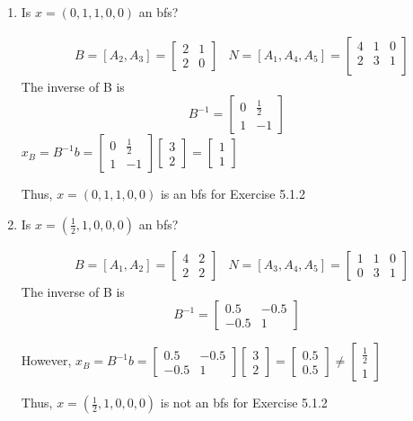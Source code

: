 \documentclass[11pt]{article}
\begin{document}
\begin{enumerate}
    \item Is $x=(0, 1, 1, 0, 0)$ an bfs? \par
    \begin{align*}
        & B = [A_2, A_3] = \begin{bmatrix}2 & 1 \\ 2 & 0\end{bmatrix} & N = [A_1, A_4, A_5] = \begin{bmatrix} 4 & 1 & 0 \\ 2 & 3 & 1 \\ \end{bmatrix}
    \end{align*}
    The inverse of B is $$B^{-1} = \begin{bmatrix} 0 &  \frac{1}{2} \\ 1 & -1 \end{bmatrix}$$
    $x_B = B^{-1}b = \begin{bmatrix} 0 &  \frac{1}{2} \\ 1 & -1 \end{bmatrix} \begin{bmatrix} 3 \\  2\end{bmatrix} = \begin{bmatrix} 1 \\ 1\end{bmatrix} $
    
    Thus, $x=(0, 1, 1, 0, 0)$ is an bfs for Exercise 5.1.2
    
    \item Is $x=(\frac{1}{2}, 1, 0, 0, 0)$ an bfs? \par
    \begin{align*}
        & B = [A_1, A_2] = \begin{bmatrix}4 & 2 \\ 2 & 2\end{bmatrix} & N = [A_3, A_4, A_5] = \begin{bmatrix} 1 & 1 & 0 \\ 0 & 3 & 1 \end{bmatrix}
    \end{align*}
    The inverse of B is $$B^{-1} = \begin{bmatrix} 0.5 & -0.5 \\ -0.5 & 1\end{bmatrix}$$
    
    However,
    $x_B = B^{-1}b = \begin{bmatrix} 0.5 & -0.5 \\ -0.5 & 1\end{bmatrix} \begin{bmatrix} 3 \\  2\end{bmatrix} = \begin{bmatrix} 0.5 \\ 0.5\end{bmatrix} \not= \begin{bmatrix} \frac{1}{2} \\ 1\end{bmatrix}$
    
    Thus, $x=(\frac{1}{2}, 1, 0, 0, 0)$ is not an bfs for Exercise 5.1.2
\end{enumerate}
\end{document}
